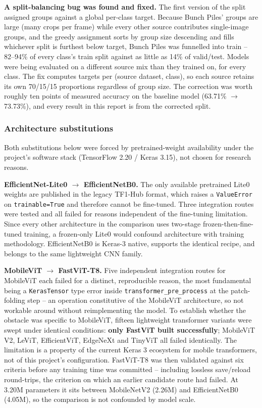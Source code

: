 \documentclass{article}
\begin{document}
\textbf{A split-balancing bug was found and fixed.} The first version of the split assigned groups against
a global per-class target. Because Bunch Piles' groups are large (many crops per frame) while every other
source contributes single-image groups, and the greedy assignment sorts by group size descending and fills
whichever split is furthest below target, Bunch Piles was funnelled into train -- 82--94\% of every
class's train split against as little as 14\% of valid/test. Models were being evaluated on a different
source mix than they trained on, for every class. The fix computes targets per (source dataset, class), so
each source retains its own 70/15/15 proportions regardless of group size. The correction was worth
roughly ten points of measured accuracy on the baseline model (63.71\% $\rightarrow$ 73.73\%), and every
result in this report is from the corrected split.

\subsubsection{Architecture substitutions}
\label{sec:substitutions}

Both substitutions below were forced by pretrained-weight availability under the project's software stack
(TensorFlow 2.20 / Keras 3.15), not chosen for research reasons.

\textbf{EfficientNet-Lite0 $\rightarrow$ EfficientNetB0.} The only available pretrained Lite0 weights are
published in the legacy TF1-Hub format, which raises a \texttt{ValueError} on \texttt{trainable=True} and
therefore cannot be fine-tuned. Three integration routes were tested and all failed for reasons independent
of the fine-tuning limitation. Since every other architecture in the comparison uses two-stage
frozen-then-fine-tuned training, a frozen-only Lite0 would confound architecture with training
methodology. EfficientNetB0 is Keras-3 native, supports the identical recipe, and belongs to the same
lightweight CNN family.

\textbf{MobileViT $\rightarrow$ FastViT-T8.} Five independent integration routes for MobileViT each failed
for a distinct, reproducible reason, the most fundamental being a \texttt{KerasTensor} type error inside
\texttt{transformer\_pre\_process} at the patch-folding step -- an operation constitutive of the MobileViT
architecture, so not workable around without reimplementing the model. To establish whether the obstacle
was specific to MobileViT, fifteen lightweight transformer variants were swept under identical conditions:
\textbf{only FastViT built successfully}; MobileViT V2, LeViT, EfficientViT, EdgeNeXt and TinyViT all
failed identically. The limitation is a property of the current Keras 3 ecosystem for mobile transformers,
not of this project's configuration. FastViT-T8 was then validated against six criteria before any
training time was committed -- including lossless save/reload round-trips, the criterion on which an
earlier candidate route had failed. At 3.20M parameters it sits between MobileNetV2 (2.26M) and
EfficientNetB0 (4.05M), so the comparison is not confounded by model scale.
\end{document}
